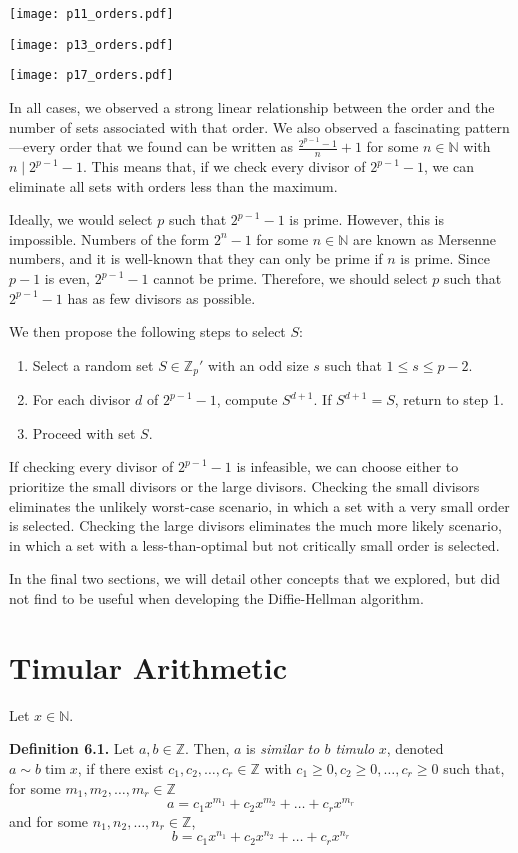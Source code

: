 \documentclass{article}
\newcommand{\tim}{\;\text{tim}\;}
\newcommand{\zee}{\mathbb{Z}}
\newcommand{\N}{\mathbb{N}}
\begin{document}
\texttt{[image: p11\_orders.pdf]}

\texttt{[image: p13\_orders.pdf]}

\texttt{[image: p17\_orders.pdf]}

In all cases, we observed a strong linear relationship between
the order and the number of sets associated with that order.
We also observed a fascinating pattern---every order that
we found can be written as $\frac{2^{p-1}-1}{n} + 1$
for some $n \in \N$ with $n \mid 2^{p-1}-1$.
This means that, if we check every divisor of $2^{p-1}-1$,
we can eliminate all sets with orders less than the maximum.

Ideally, we would select $p$ such that $2^{p-1}-1$ is prime.
However, this is impossible. Numbers of the form $2^n-1$
for some $n \in \N$ are known as Mersenne numbers,
and it is well-known that they can only be prime if $n$ is prime.
Since $p-1$ is even, $2^{p-1}-1$ cannot be prime.
Therefore, we should select $p$
such that $2^{p-1}-1$ has as few divisors as possible.

We then propose the following steps to select $S$:
\begin{enumerate}
    \item Select a random set $S \in \zee_p'$ with an odd size
    $s$ such that $1 \leq s \leq p - 2$.
    \item For each divisor $d$ of $2^{p-1}-1$, compute
    $S^{d+1}$. If $S^{d+1} = S$, return to step 1.
    \item Proceed with set $S$.
\end{enumerate}
If checking every divisor of $2^{p-1}-1$ is infeasible, we can
choose either to prioritize the small divisors or the large divisors.
Checking the small divisors eliminates the unlikely
worst-case scenario, in which a set with a very small order is selected.
Checking the large divisors eliminates the much more likely scenario,
in which a set with a less-than-optimal but not critically small order
is selected.

In the final two sections, we will detail other concepts that we
explored, but did not find to be useful when developing the Diffie-Hellman
algorithm.

\section{Timular Arithmetic}

Let $x \in \N$.

\textbf{Definition 6.1.} Let $a, b \in \zee$.
Then, $a$ is \textit{similar to $b$ timulo} $x$,
denoted $a \sim b \tim x$,
if there exist $c_1, c_2, \ldots, c_r \in \zee$
with $c_1 \geq 0, c_2 \geq 0, \ldots, c_r \geq 0$
such that, for some $m_1, m_2, \ldots, m_r \in \zee$
\[a = c_1x^{m_1} + c_2x^{m_2} + \ldots + c_rx^{m_r}\]
and for some $n_1, n_2, \ldots, n_r \in \zee$,
\[b = c_1x^{n_1} + c_2x^{n_2} + \ldots + c_rx^{n_r}\]
\end{document}
